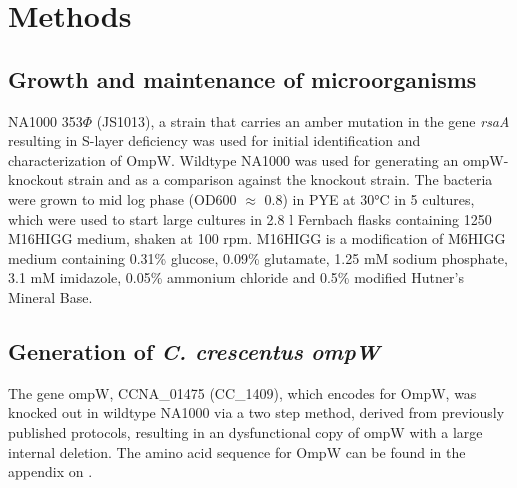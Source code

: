\section{Methods}
\label{sec:porin_methods}
\subsection{Growth and maintenance of microorganisms} 
\label{sub:porin_growth}
\caulobacter NA1000 353$\Phi$ (JS1013), a strain that carries an amber mutation in the gene \textit{rsaA} resulting in S-layer deficiency was used for initial identification and characterization of OmpW. Wildtype \caulobacter NA1000 was used for generating an ompW-knockout strain and as a comparison against the knockout strain. The bacteria were  grown to mid log phase (\ac{OD600} $\approx$ 0.8) in \ac{PYE} at 30\si{\degreeCelsius} in 5 \millilitre cultures, which were used to start large cultures in 2.8 \si{\litre} Fernbach flasks containing 1250 \millilitre M16HIGG medium, shaken at 100 rpm. M16HIGG is a modification of M6HIGG medium containing 0.31\% glucose, 0.09\% glutamate, 1.25 mM sodium phosphate, 3.1 mM imidazole, 0.05\% ammonium chloride and 0.5\% modified Hutner's Mineral Base.

\subsection{Generation of \textit{C. crescentus} \del \textit{ompW}}
\label{sub:porin_knockout}
The gene ompW, CCNA\_01475 (CC\_1409), which encodes for OmpW, was knocked out in wildtype \caulobacter NA1000 via a two step method, derived from previously published protocols, resulting in an dysfunctional copy of ompW with a large internal deletion. The amino acid sequence for OmpW can be found in the appendix on .

